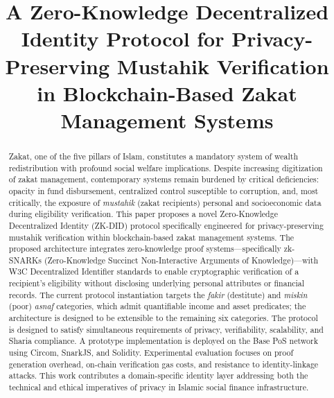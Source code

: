 \documentclass[conference]{IEEEtran}
\begin{document}
\title{A Zero-Knowledge Decentralized Identity Protocol for Privacy-Preserving Mustahik Verification in Blockchain-Based Zakat Management Systems}

\author{
\and
{}
}

\maketitle

\begin{abstract}
Zakat, one of the five pillars of Islam, constitutes a mandatory system of wealth redistribution with profound social welfare implications. Despite increasing digitization of zakat management, contemporary systems remain burdened by critical deficiencies: opacity in fund disbursement, centralized control susceptible to corruption, and, most critically, the exposure of \textit{mustahik} (zakat recipients) personal and socioeconomic data during eligibility verification. This paper proposes a novel Zero-Knowledge Decentralized Identity (ZK-DID) protocol specifically engineered for privacy-preserving mustahik verification within blockchain-based zakat management systems. The proposed architecture integrates zero-knowledge proof systems---specifically zk-SNARKs (Zero-Knowledge Succinct Non-Interactive Arguments of Knowledge)---with W3C Decentralized Identifier standards to enable cryptographic verification of a recipient's eligibility without disclosing underlying personal attributes or financial records. The current protocol instantiation targets the \textit{fakir} (destitute) and \textit{miskin} (poor) \textit{asnaf} categories, which admit quantifiable income and asset predicates; the architecture is designed to be extensible to the remaining six categories. The protocol is designed to satisfy simultaneous requirements of privacy, verifiability, scalability, and Sharia compliance. A prototype implementation is deployed on the Base PoS network using Circom, SnarkJS, and Solidity. Experimental evaluation focuses on proof generation overhead, on-chain verification gas costs, and resistance to identity-linkage attacks. This work contributes a domain-specific identity layer addressing both the technical and ethical imperatives of privacy in Islamic social finance infrastructure.
\end{abstract}
\end{document}
